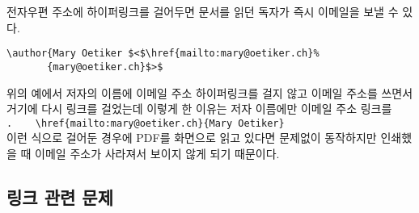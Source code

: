 전자우편 주소에 하이퍼링크를 걸어두면 문서를 읽던 독자가 즉시 이메일을 보낼 수 있다. 
\begin{code}
\begin{verbatim}
\author{Mary Oetiker $<$\href{mailto:mary@oetiker.ch}%
       {mary@oetiker.ch}$>$
\end{verbatim}
\end{code}
위의 예에서 저자의 이름에 이메일 주소 하이퍼링크를 걸지 않고 이메일 주소를 쓰면서 거기에 다시 링크를 걸었는데 이렇게 한 이유는 저자 이름에만 이메일 주소 링크를 \\
\verb+.    \href{mailto:mary@oetiker.ch}{Mary Oetiker}+\\
이런 식으로 걸어둔 경우에 PDF를 화면으로 읽고 있다면 문제없이 동작하지만 인쇄했을 때 이메일 주소가 사라져서 보이지 않게 되기 때문이다.

\subsection{링크 관련 문제}

